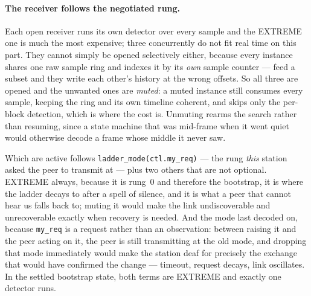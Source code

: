 \paragraph{The receiver follows the negotiated rung.} Each open receiver
runs its own detector over every sample and the EXTREME one is much the
most expensive; three concurrently do not fit real time on this part.
They cannot simply be opened selectively either, because every instance
shares one raw sample ring and indexes it by its \emph{own} sample
counter --- feed a subset and they write each other's history at the
wrong offsets. So all three are opened and the unwanted ones are
\emph{muted}: a muted instance still consumes every sample, keeping the
ring and its own timeline coherent, and skips only the per-block
detection, which is where the cost is. Unmuting rearms the search rather
than resuming, since a state machine that was mid-frame when it went
quiet would otherwise decode a frame whose middle it never saw.

Which are active follows \texttt{ladder\_mode(ctl.my\_req)} --- the rung
\emph{this} station asked the peer to transmit at --- plus two others
that are not optional. EXTREME always, because it is rung~0 and
therefore the bootstrap, it is where the ladder decays to after a spell
of silence, and it is what a peer that cannot hear us falls back to;
muting it would make the link undiscoverable and unrecoverable exactly
when recovery is needed. And the mode last decoded on, because
\texttt{my\_req} is a request rather than an observation: between raising
it and the peer acting on it, the peer is still transmitting at the old
mode, and dropping that mode immediately would make the station deaf for
precisely the exchange that would have confirmed the change --- timeout,
request decays, link oscillates. In the settled bootstrap state, both
terms are EXTREME and exactly one detector runs.

